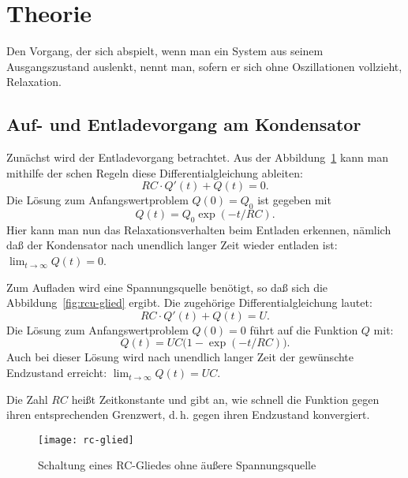 
\section{Theorie}

Den Vorgang, der sich abspielt, wenn man ein System aus seinem
Ausgangszustand auslenkt, nennt man, sofern er sich ohne Oszillationen
vollzieht, Relaxation.

\subsection{Auf- und Entladevorgang am Kondensator}
Zunächst wird der Entladevorgang betrachtet. Aus der
Abbildung~\ref{fig:rc-glied} kann man mithilfe der schen
Regeln diese Differentialgleichung ableiten:
%
\begin{equation}
  \label{eq:rc-dgl}
  RC\cdot Q'(t) + Q(t) = 0 \text{.}
\end{equation}
%
Die Lösung zum Anfangswertproblem $Q(0) = Q_0$ ist gegeben mit
%
\begin{equation}
  \label{eq:sol-rc-dgl}
  Q(t) = Q_0 \exp(-t/RC) \text{.}
\end{equation}
%
Hier kann man nun das Relaxationsverhalten beim Entladen erkennen,
nämlich daß der Kondensator nach unendlich langer Zeit wieder entladen
ist: $\lim_{t\to\infty} Q(t) = 0$.

Zum Aufladen wird eine Spannungsquelle benötigt, so daß sich die
Abbildung~\ref{fig:rcu-glied} ergibt. Die zugehörige
Differentialgleichung lautet:
%
\begin{equation}
  \label{eq:rcu-dgl}
  RC\cdot Q'(t) + Q(t) = U \text{.}
\end{equation}
%
Die Lösung zum Anfangswertproblem $Q(0) = 0$ führt auf die Funktion $Q$
mit:
%
\begin{equation}
  \label{eq:sol-rcu-dgl}
  Q(t) = UC \Big(1-\exp(-t/RC)\Big) \text{.}
\end{equation}
%
Auch bei dieser Lösung wird nach unendlich langer Zeit der gewünschte
Endzustand erreicht: $\lim_{t\to\infty} Q(t) = UC$. 

Die Zahl $RC$ heißt Zeitkonstante und gibt an, wie schnell die Funktion
gegen ihren entsprechenden Grenzwert, d.\,h. gegen ihren Endzustand
konvergiert.

\begin{figure}
  \centering
  \texttt{[image: rc-glied]}
  \caption{Schaltung eines RC-Gliedes ohne äußere Spannungsquelle}
  \label{fig:rc-glied}
\end{figure}

